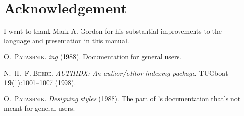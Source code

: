 \documentclass[a4paper]{article}
\begin{document}
\section{Acknowledgement}

I want to thank Mark A. Gordon for his substantial improvements to the language
and presentation in this manual.

\begin{thebibliography}{3}

\textsc{O.~Patashnik}.
\newblock \textsl{{\BibTeX ing}} (1988).
\newblock Documentation for general {\BibTeX} users.

\textsc{N.~H.~F. Beebe}.
\newblock \textsl{{AUTHIDX}: An author/editor indexing package}.
\newblock TUGboat \textbf{19}(1):1001--1007 (1998).

\textsc{O.~Patashnik}.
\newblock \textsl{Designing {\BibTeX} styles} (1988).
\newblock The part of \BibTeX's documentation that's not meant for general
  users.

\end{thebibliography}
\end{document}

